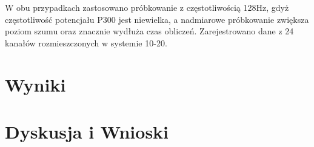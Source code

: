 \documentclass[licencjacka,openright]{pracamgr}
\begin{document}
W obu przypadkach zastosowano próbkowanie z częstotliwością 128Hz, gdyż częstotliwość potencjału P300 jest niewielka, a nadmiarowe próbkowanie zwiększa poziom szumu oraz znacznie wydłuża czas obliczeń. Zarejestrowano dane z 24 kanałów rozmieszczonych w systemie 10-20.



\chapter{Wyniki}

\chapter{Dyskusja i Wnioski}



\end{document}
